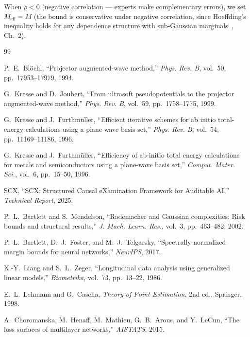 \documentclass[11pt,a4paper]{article}
\theoremstyle{definition}
\begin{document}
When $\bar{\rho} < 0$ (negative correlation — experts make complementary errors), we set $M_{\mathrm{eff}} = M$ (the bound is conservative under negative correlation, since Hoeffding's inequality holds for any dependence structure with sub-Gaussian marginals~\cite{Wainwright2019}, Ch.~2).


\begin{thebibliography}{99}

P.~E.~Bl\"ochl, ``Projector augmented-wave method,'' \textit{Phys. Rev. B}, vol.~50, pp.~17953--17979, 1994.

G.~Kresse and D.~Joubert, ``From ultrasoft pseudopotentials to the projector augmented-wave method,'' \textit{Phys. Rev. B}, vol.~59, pp.~1758--1775, 1999.

G.~Kresse and J.~Furthm\"uller, ``Efficient iterative schemes for ab initio total-energy calculations using a plane-wave basis set,'' \textit{Phys. Rev. B}, vol.~54, pp.~11169--11186, 1996.

G.~Kresse and J.~Furthm\"uller, ``Efficiency of ab-initio total energy calculations for metals and semiconductors using a plane-wave basis set,'' \textit{Comput. Mater. Sci.}, vol.~6, pp.~15--50, 1996.

SCX, ``SCX: Structured Causal eXamination Framework for Auditable AI,'' \textit{Technical Report}, 2025.

P.~L.~Bartlett and S.~Mendelson, ``Rademacher and Gaussian complexities: Risk bounds and structural results,'' \textit{J. Mach. Learn. Res.}, vol.~3, pp.~463--482, 2002.

P.~L.~Bartlett, D.~J.~Foster, and M.~J.~Telgarsky, ``Spectrally-normalized margin bounds for neural networks,'' \textit{NeurIPS}, 2017.

K.-Y.~Liang and S.~L.~Zeger, ``Longitudinal data analysis using generalized linear models,'' \textit{Biometrika}, vol.~73, pp.~13--22, 1986.

E.~L.~Lehmann and G.~Casella, \textit{Theory of Point Estimation}, 2nd ed., Springer, 1998.

A.~Choromanska, M.~Henaff, M.~Mathieu, G.~B.~Arous, and Y.~LeCun, ``The loss surfaces of multilayer networks,'' \textit{AISTATS}, 2015.


\end{thebibliography}
\end{document}

